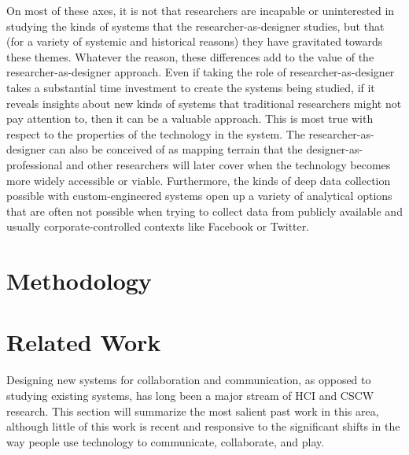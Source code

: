 On most of these axes, it is not that researchers are incapable or uninterested in studying the kinds of systems that the researcher-as-designer studies, but that (for a variety of systemic and historical reasons) they have gravitated towards these themes. Whatever the reason, these differences add to the value of the researcher-as-designer approach. Even if taking the role of researcher-as-designer takes a substantial time investment to create the systems being studied, if it reveals insights about new kinds of systems that traditional researchers might not pay attention to, then it can be a valuable approach. This is most true with respect to the properties of the technology in the system. The researcher-as-designer can also be conceived of as mapping terrain that the designer-as-professional and other researchers will later cover when the technology becomes more widely accessible or viable. Furthermore, the kinds of deep data collection possible with custom-engineered systems open up a variety of analytical options that are often not possible when trying to collect data from publicly available and usually corporate-controlled contexts like Facebook or Twitter.

\section{Methodology}



\section{Related Work}
Designing new systems for collaboration and communication, as opposed to studying existing systems, has long been a major stream of HCI and CSCW research. This section will summarize the most salient past work in this area, although little of this work is recent and responsive to the significant shifts in the way people use technology to communicate, collaborate, and play. 

